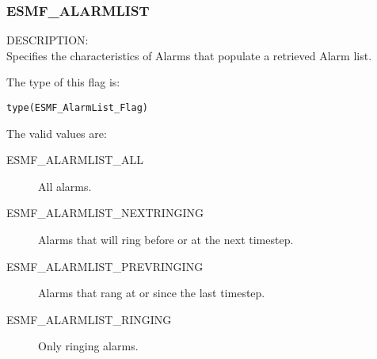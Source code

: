 
\subsubsection{ESMF\_ALARMLIST}
\label{const:alarmlist}

{\sf DESCRIPTION:\\}
Specifies the characteristics of Alarms that populate
a retrieved Alarm list.

The type of this flag is:

{\tt type(ESMF\_AlarmList\_Flag)}

The valid values are:
\begin{description}

\item [ESMF\_ALARMLIST\_ALL] 
      All alarms.

\item [ESMF\_ALARMLIST\_NEXTRINGING] 
      Alarms that will ring before or at the next timestep.

\item [ESMF\_ALARMLIST\_PREVRINGING] 
      Alarms that rang at or since the last timestep.

\item [ESMF\_ALARMLIST\_RINGING] 
      Only ringing alarms.

\end{description}

